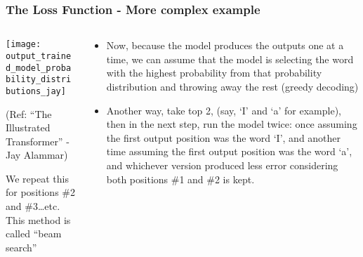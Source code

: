 \begin{frame}[fragile]\frametitle{The Loss Function - More complex example}

\begin{columns}
    \begin{column}[T]{0.5\linewidth}
\begin{center}
\texttt{[image: output\_trained\_model\_probability\_distributions\_jay]}


{\tiny (Ref: ``The Illustrated Transformer'' - Jay Alammar)}
\end{center}		

 We repeat this for positions \#2 and \#3…etc. This method is called ``beam search''
		\end{column}
    \begin{column}[T]{0.5\linewidth}

\begin{itemize}
\item Now, because the model produces the outputs one at a time, we can assume that the model is selecting the word with the highest probability from that probability distribution and throwing away the rest (greedy decoding)
\item Another way, take top 2, (say, ‘I’ and ‘a’ for example), then in the next step, run the model twice: once assuming the first output position was the word ‘I’, and another time assuming the first output position was the word ‘a’, and whichever version produced less error considering both positions \#1 and \#2 is kept.
\end{itemize}
    \end{column}
  \end{columns}	

\end{frame}

